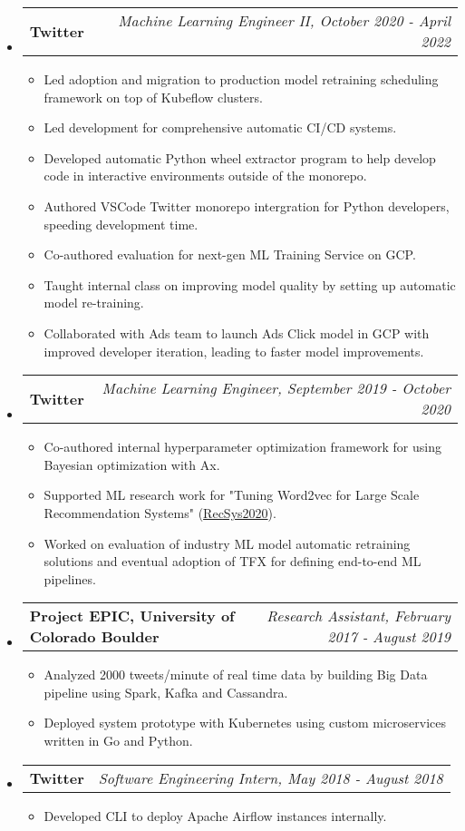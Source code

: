 \documentclass[letterpaper,10pt]{article}
\makeatletter
\newcommand{\resitem}[1]{\item #1 \vspace{-2pt}}
\newcommand{\ressubheading}[4]{
\begin{tabular*}{7.0in}{l@{\extracolsep{\fill}}r}
		\textbf{#1} & \textit{#4} \\
\end{tabular*}\vspace{-6pt}}
\makeatother
\begin{document}
\begin{itemize}
		\item
			\ressubheading{Twitter}{Boulder, CO}{Machine Learning Engineer II}{Machine Learning Engineer II, October 2020 - April 2022}
			\begin{itemize}
				\resitem{Led adoption and migration to production model retraining scheduling framework on top of Kubeflow clusters.}
				\resitem{Led development for comprehensive automatic CI/CD systems. } 
				\resitem{Developed automatic Python wheel extractor program to help develop code in interactive environments outside of the monorepo.}
				\resitem{Authored VSCode Twitter monorepo intergration for Python developers, speeding development time.}
				\resitem{Co-authored evaluation for next-gen ML Training Service on GCP.}
				\resitem{Taught internal class on improving model quality by setting up automatic model re-training.}
				\resitem{Collaborated with Ads team to launch Ads Click model in GCP with improved developer iteration, leading to faster model improvements.}
			\end{itemize}
		\item
			\ressubheading{Twitter}{Boulder, CO}{Machine Learning Engineer}{Machine Learning Engineer, September 2019 - October 2020}
			\begin{itemize}
				\resitem{Co-authored internal hyperparameter optimization framework for using Bayesian optimization with Ax.}
				\resitem{Supported ML research work for "Tuning Word2vec for Large Scale Recommendation Systems" (\href{https://arxiv.org/pdf/2009.12192.pdf}{RecSys2020}).}
				\resitem{Worked on evaluation of industry ML model automatic retraining solutions and eventual adoption of TFX for defining end-to-end ML pipelines.}
			\end{itemize}
		\item
			\ressubheading{Project EPIC, University of Colorado Boulder}{Boulder, CO}{Research Assistant}{Research Assistant, February 2017 - August 2019}
			\begin{itemize}
				\resitem{Analyzed 2000 tweets/minute of real time data by building Big Data pipeline using Spark, Kafka and Cassandra.} 
				\resitem{Deployed system prototype with Kubernetes using custom microservices written in Go and Python.}
			\end{itemize}
			\item
			\ressubheading{Twitter}{Boulder, CO}{Software Engineering Intern}{Software Engineering Intern, May 2018 - August 2018}
			\begin{itemize}
				\resitem{Developed CLI to deploy Apache Airflow instances internally.}

\end{itemize}
\end{itemize}
\end{document}
